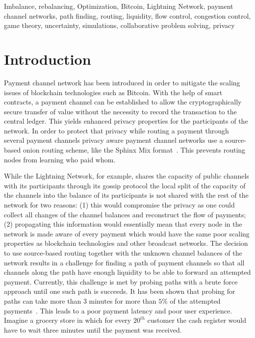 \documentclass[conference]{IEEEtran}
\begin{document}
\begin{IEEEkeywords}
Imbalance, rebalancing, Optimization, Bitcoin, Lightning Network, payment channel networks, path finding, routing, liquidity, flow control, congestion control, game theory, uncertainty, simulations, collaborative problem solving, privacy 
\end{IEEEkeywords}



\section{Introduction}
Payment channel network has been introduced in order to mitigate the scaling issues of blockchain technologies such as Bitcoin\cite{poon2016bitcoin}.
With the help of smart contracts, a payment channel can be established to allow the cryptographically secure transfer of value without the necessity to record the transaction to the central ledger.
This yields enhanced privacy properties for the participants of the network.
In order to protect that privacy while routing a payment through several payment channels privacy aware payment channel networks use a source-based onion routing scheme, like the Sphinx Mix format~\cite{danezis2009sphinx}.
This prevents routing nodes from learning who paid whom.

While the Lightning Network, for example, shares the capacity of public channels with its participants through its gossip protocol the local split of the capacity of the channels into the balance of its participants is not shared with the rest of the network for two reasons:
(1) this would compromise the privacy as one could collect all changes of the channel balances and reconstruct the flow of payments;
(2) propagating this information would essentially mean that every node in the network is made aware of every payment which would have the same poor scaling properties as blockchain technologies and other broadcast networks.
The decision to use source-based routing together with the unknown channel balances of the network results in a challenge for finding a path of payment channels so that all channels along the path have enough liquidity to be able to forward an attempted payment.
Currently, this challenge is met by probing paths with a brute force approach until one such path is succeeds.
It has been shown that probing for paths can take more than 3 minutes for more than $5\%$ of the attempted payments~\cite{decker2019lnconf}. This leads to a poor payment latency and poor user experience.
Imagine a grocery store in which for every $20^{th}$ customer the cash register would have to wait three minutes until the payment was received.
\end{document}
